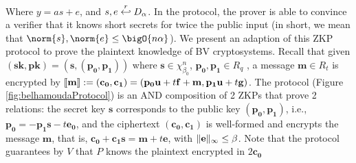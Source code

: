 Where $y = as + e$, and $s, e \stackrel{r}{\hookleftarrow} D_{\alpha}$. In the protocol, the
prover is able to convince a verifier that it knows short secrets for twice the
public input (in short, we mean that $\norm{s},\norm{e} \leq \bigO{n\alpha}$).
We present an adaption of this ZKP protocol to prove the plaintext knowledge of
BV cryptosystems. Recall that given $\mathbf{(sk,pk) = (s,(p_0,p_1))}$ where
$\mathbf{s} \in \chi_{\beta_0}^n$, $\mathbf{p_0,p_1} \in R_q$ , a message
$\mathbf{m} \in R_t$ is encrypted by
$\left\llbracket\mathbf{m}\right\rrbracket := \mathbf{(c_0, c_1)} = (\mathbf{p_0u} + t\mathbf{f + m,
  p_1u} + t\mathbf{g)}$. The protocol (Figure \ref{fig:belhamoudaProtocol}) is
an AND composition of 2 ZKPs that prove 2 relations: the secret key $\mathbf{s}$
corresponds to the public key $\mathbf{(p_0,p_1)}$, i.e.,
$\mathbf{p_0 = -p_1s} - t\mathbf{e_0}$, and the ciphertext $\mathbf{(c_0,c_1)}$
is well-formed and encrypts the message $\mathbf{m}$, that is,
$\mathbf{c_0 + c_1s} = \mathbf{m} + t\mathbf{e}$, with
$\Vert \mathbf{e} \Vert_{\infty} \leq \beta$. Note that the protocol guarantees by $V$
that $P$ knows the plaintext encrypted in $2\mathbf{c_0}$

